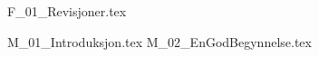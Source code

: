 \documentclass[a4paper,12pt,oneside]{book}
\begin{document}
\maketitle
\frontmatter
\listoftodos
\newpage
{F_01_Revisjoner.tex}
\listoffigures
\listoftables
\lstlistoflistings
\tableofcontents
\mainmatter
{M_01_Introduksjon.tex}
{M_02_EnGodBegynnelse.tex}
\appendix
\printbibliography[heading=bibnumbered]
\end{document}
